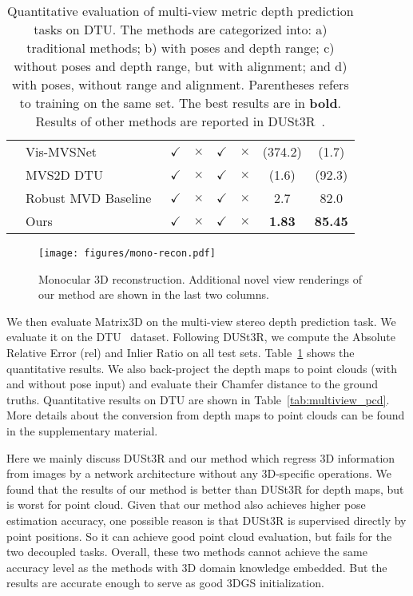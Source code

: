 \begin{table}[t]
{\begin{tabular}{ll|cccc|cc}
    & Vis-MVSNet~\cite{zhang2023vis} & $\checkmark$ & $\times$ & $\checkmark$ & $\times$  & (374.2)  & (1.7) \\
    & MVS2D DTU~\cite{yang2022mvs2d} & $\checkmark$ & $\times$ & $\checkmark$ & $\times$  & (1.6) & (92.3) \\
    & Robust MVD Baseline~\cite{schroppel2022benchmark} & $\checkmark$ & $\times$ & $\checkmark$ & $\times$  & 2.7 & 82.0 \\
    & Ours & $\checkmark$ & $\times$ & $\checkmark$ & $\times$  & \textbf{1.83}   & \textbf{85.45} \\
    \bottomrule
\end{tabular}
}
\vspace{-3mm}
\caption{Quantitative evaluation of multi-view metric depth prediction tasks on DTU. The methods are categorized into: a) traditional methods; b) with poses and depth range; c) without poses and depth range, but with alignment; and d) with poses, without range and alignment. Parentheses
refers to training on the same set. The best results are in \textbf{bold}. Results of other methods are reported in DUSt3R~\cite{wang2024dust3r}.}
\vspace{-5mm}
\label{tab:multiview_depth}
\end{table}


\begin{figure}[t]
    \centering
    \texttt{[image: figures/mono-recon.pdf]}
    \vspace{-7mm}
    \caption{Monocular 3D reconstruction. Additional novel view renderings of our method are shown in the last two columns.
    }
    \vspace{-6mm}
    \label{fig:mono-recon}
\end{figure}



 We then evaluate Matrix3D on the multi-view stereo depth prediction task. We evaluate it on the DTU~\cite{aanaes2016large} dataset. Following DUSt3R, we compute the Absolute Relative Error (rel) and Inlier Ratio on all test sets. Table~\ref{tab:multiview_depth} shows the quantitative results. We also back-project the depth maps to point clouds (with and without pose input) and evaluate their Chamfer distance to the ground truths. 
Quantitative results on DTU are shown in Table~\ref{tab:multiview_pcd}. More details about the conversion from depth maps to point clouds can be found in the supplementary material. 

Here we mainly discuss DUSt3R and our method which regress 3D information from images by a network architecture without any 3D-specific operations. We found that the results of our method is better than DUSt3R for depth maps, but is worst for point cloud. Given that our method also achieves higher pose estimation accuracy, one possible reason is that DUSt3R is supervised directly by point positions. So it can achieve good point cloud evaluation, but fails for the two decoupled tasks. Overall, these two methods cannot achieve the same accuracy level as the methods with 3D domain knowledge embedded. But the results are accurate enough to serve as good 3DGS initialization.




